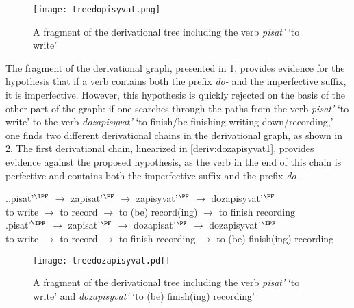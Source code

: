 \begin{figure}
\begin{center}
\texttt{[image: treedopisyvat.png]}
\caption{A fragment of the derivational tree including the verb \textit{pisat'} `to write'\label{tree:dopisyvat}}
\end{center}
\end{figure}

The fragment of the derivational graph, presented in \ref{tree:dopisyvat}, provides evidence for the hypothesis that if a verb contains both the prefix \textit{do-} and the imperfective suffix, it is imperfective. However, this hypothesis is quickly rejected on the basis of the other part of the graph: if one searches through the paths from the verb {\it pisat'} `to write' to the verb {\it dozapisyvat'} `to finish/be finishing writing down/recording,' one finds two different derivational chains in the derivational graph, as shown in \ref{tree:dozapisyvat}. The first derivational chain, linearized in \ref{deriv:dozapisyvat1}, provides evidence against the proposed hypothesis, as the verb in the end of this chain is perfective and contains both the imperfective suffix and the prefix \textit{do-}. 

\ex.\label{deriv:dozapisyvat}\ag.\label{deriv:dozapisyvat1}pisat'$^\IPF$ $\rightarrow$ zapisat'$^\PF$ $\rightarrow$ zapisyvat'$^\PF$ $\rightarrow$ dozapisyvat'$^\PF$\\
{to write} $\rightarrow$ {to record} $\rightarrow$ {to (be) record(ing)} $\rightarrow$ {to finish recording}\\
\bg.\label{deriv:dozapisyvat2}pisat'$^\IPF$ $\rightarrow$ zapisat'$^\PF$ $\rightarrow$ dozapisat'$^\PF$ $\rightarrow$ dozapisyvat'$^\IPF$\\
{to write} $\rightarrow$ {to record} $\rightarrow$ {to finish recording} $\rightarrow$ {to (be) finish(ing) recording}\\				

\begin{figure}
\begin{center}
\texttt{[image: treedozapisyvat.pdf]}
\caption{A fragment of the derivational tree including the verb \textit{pisat'} `to write' and \textit{dozapisyvat'} `to (be) finish(ing) recording'\label{tree:dozapisyvat}}
\end{center}
\end{figure}			

